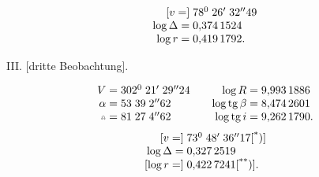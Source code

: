 \[
\begin{array}{r@{\;}l}
{}[v=]&78^0\;26'\;32''49\\
\log\Delta=&0{,}374\,1524\\
\log r=&0{,}419\,1792.
\end{array}
\]
\begin{center}III. [dritte Beobachtung].\end{center}
\noindent{\small [S. 8]}\par
\[
\begin{array}{r@{\;}c@{\;}l@{\qquad}r@{\;}c@{\;}l}
V&=&302^0\;21'\;29''24&\log R&=&9{,}993\,1886\\
\alpha&=&53\;39\;2''62&\log\operatorname{tg}\beta&=&8{,}474\,2601\\
\AstNode&=&81\;27\;4''62&\log\operatorname{tg}i&=&9{,}262\,1790.
\end{array}
\]
\[
\begin{array}{r@{\;}l}
{}[v=]&73^0\;48'\;36''17\text{[\textsuperscript{*})]}\\
\log\Delta=&0{,}327\,2519\\
{}[\log r=]&0{,}422\,7241\text{[\textsuperscript{**})]}.
\end{array}
\]
\begingroup\renewcommand{\thefootnote}{}
\endgroup
\clearpage\endgroup
